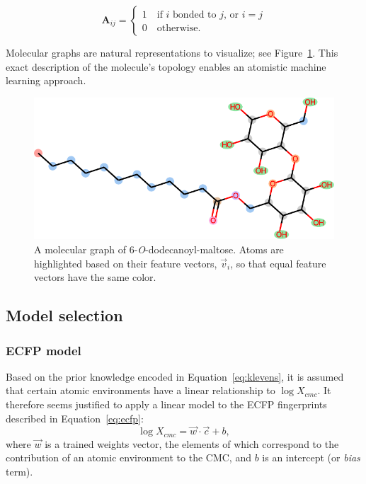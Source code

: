 \begin{equation}
    \label{eq:adjacency-mat}
    \mathbf{A}_{ij} = \begin{cases}
        1 \quad \text{if } i \text { bonded to } j \text{, or } i = j \\
        0 \quad \text{otherwise.}
    \end{cases}
\end{equation}

Molecular graphs are natural representations to visualize; see
Figure~\ref{fig:mol-graph}. This exact description of the molecule's topology
enables an atomistic machine learning approach.

\begin{figure}
    \centering
    \includegraphics[width=.8\linewidth]{images/molecular-graph.pdf}
    \caption{A molecular graph of 6-\textit{O}-dodecanoyl-maltose. Atoms are
        highlighted based on their feature vectors, $\vec{v}_i$, so that equal
        feature vectors have the same color.}
    \label{fig:mol-graph}
\end{figure}

\subsection{Model selection}

\subsubsection{ECFP model}

Based on the prior knowledge encoded in Equation~\ref{eq:klevens}, it is
assumed that certain atomic environments have a linear relationship to $\log X_{cmc}$. It therefore seems justified to apply a linear model to the ECFP fingerprints described in Equation~\ref{eq:ecfp}:
\begin{equation}
    \label{eq:linear-ecfp}
    \log X_{cmc} = \vec{w} \cdot \vec{c} + b,
\end{equation}
where $\vec{w}$ is a trained weights vector, the elements of which correspond to the contribution of an atomic environment to the CMC, and $b$ is an intercept (or \emph{bias} term).

